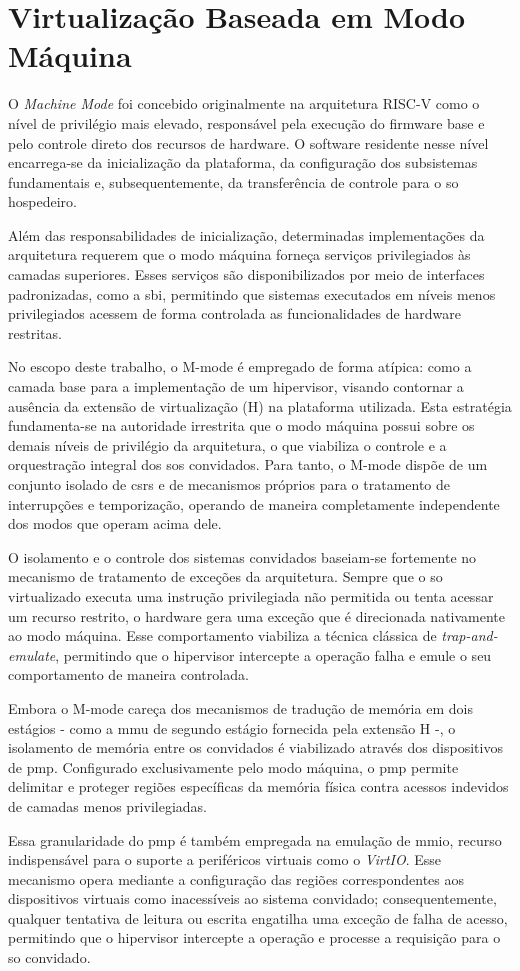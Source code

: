 \section{Virtualização Baseada em Modo Máquina}

O \textit{Machine Mode} foi concebido originalmente na arquitetura RISC-V como o nível de privilégio mais elevado, responsável pela execução do firmware base e pelo controle direto dos recursos de hardware.
O software residente nesse nível encarrega-se da inicialização da plataforma, da configuração dos subsistemas fundamentais e, subsequentemente, da transferência de controle para o \gls{so} hospedeiro. 

Além das responsabilidades de inicialização, determinadas implementações da arquitetura requerem que o modo máquina forneça serviços privilegiados às camadas superiores. Esses serviços são disponibilizados
por meio de interfaces padronizadas, como a \gls{sbi}, permitindo que sistemas executados em níveis menos privilegiados acessem de forma controlada as funcionalidades de hardware restritas.

No escopo deste trabalho, o M-mode é empregado de forma atípica: como a camada base para a implementação de um hipervisor, visando contornar a ausência da extensão de virtualização (H) na plataforma utilizada.
Esta estratégia fundamenta-se na autoridade irrestrita que o modo máquina possui sobre os demais níveis de privilégio da arquitetura, o que viabiliza o controle e a orquestração integral dos \glspl{so} convidados.
Para tanto, o M-mode dispõe de um conjunto isolado de \glspl{csr} e de mecanismos próprios para o tratamento de interrupções e temporização, operando de maneira completamente independente dos modos que operam acima dele.

O isolamento e o controle dos sistemas convidados baseiam-se fortemente no mecanismo de tratamento de exceções da arquitetura. Sempre que o \gls{so} virtualizado executa uma instrução privilegiada não permitida
ou tenta acessar um recurso restrito, o hardware gera uma exceção que é direcionada nativamente ao modo máquina. Esse comportamento viabiliza a técnica clássica de \textit{trap-and-emulate}, permitindo que o hipervisor
intercepte a operação falha e emule o seu comportamento de maneira controlada.

Embora o M-mode careça dos mecanismos de tradução de memória em dois estágios - como a \gls{mmu} de segundo estágio fornecida pela extensão H -, o isolamento de memória entre os convidados é viabilizado através 
dos dispositivos de \gls{pmp}. Configurado exclusivamente pelo modo máquina, o \gls{pmp} permite delimitar e proteger regiões específicas da memória física contra acessos
indevidos de camadas menos privilegiadas.

Essa granularidade do \gls{pmp} é também empregada na emulação de \gls{mmio}, recurso indispensável para o suporte a periféricos virtuais como o \textit{VirtIO}. Esse mecanismo opera mediante a
configuração das regiões correspondentes aos dispositivos virtuais como inacessíveis ao sistema convidado; consequentemente, qualquer tentativa de leitura ou escrita engatilha uma exceção de falha de acesso,
permitindo que o hipervisor intercepte a operação e processe a requisição para o \gls{so} convidado.
